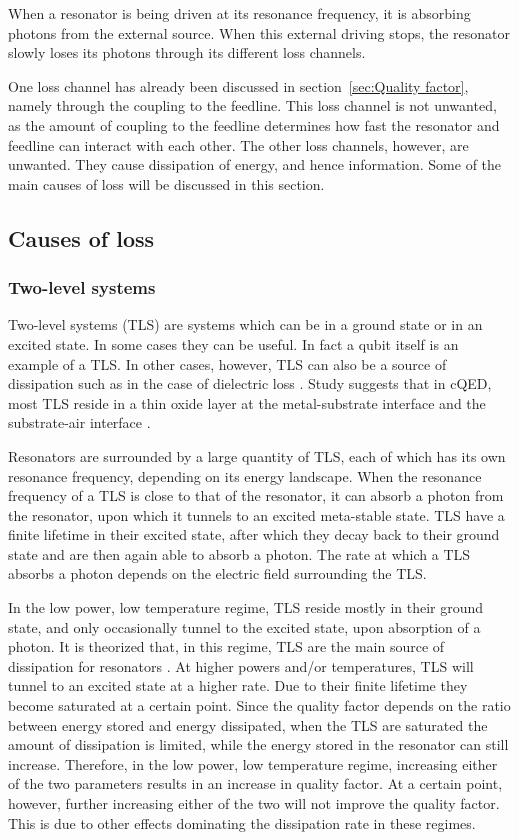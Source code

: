 When a resonator is being driven at its resonance frequency, it is absorbing photons from the external source. When this external driving stops, the resonator slowly loses its photons through its different loss channels.

One loss channel has already been discussed in section~\ref{sec:Quality factor}, namely through the coupling to the feedline. This loss channel is not unwanted, as the amount of coupling to the feedline determines how fast the resonator and feedline can interact with each other. The other loss channels, however, are unwanted. They cause dissipation of energy, and hence information. Some of the main causes of loss will be discussed in this section.


\subsection{Causes of loss}

\subsubsection{Two-level systems}
\label{sec:TLS}

Two-level systems (TLS) are systems which can be in a ground state or in an excited state. In some cases they can be useful. In fact a qubit itself is an example of a TLS. In other cases, however, TLS can also be a source of dissipation such as in the case of dielectric loss \cite{martinis2014ucsb}. Study suggests that in cQED, most TLS reside in a thin oxide layer at the metal-substrate interface and the substrate-air interface \cite{wenner2011surface}.

Resonators are surrounded by a large quantity of TLS, each of which has its own resonance frequency, depending on its energy landscape. When the resonance frequency of a TLS is close to that of the resonator, it can absorb a photon from the resonator, upon which it tunnels to an excited meta-stable state. TLS have a finite lifetime in their excited state, after which they decay back to their ground state and are then again able to absorb a photon. The rate at which a TLS absorbs a photon depends on the electric field surrounding the TLS.

In the low power, low temperature regime, TLS reside mostly in their ground state, and only occasionally tunnel to the excited state, upon absorption of a photon. It is theorized that, in this regime, TLS are the main source of dissipation for resonators \cite{gao2008experimental}. At higher powers and/or temperatures, TLS will tunnel to an excited state at a higher rate. Due to their finite lifetime they become saturated at a certain point. Since the quality factor depends on the ratio between energy stored and energy dissipated, when the TLS are saturated the amount of dissipation is limited, while the energy stored in the resonator can still increase. Therefore, in the low power, low temperature regime, increasing either of the two parameters results in an increase in quality factor. At a certain point, however, further increasing either of the two will not improve the quality factor. This is due to other effects dominating the dissipation rate in these regimes.

